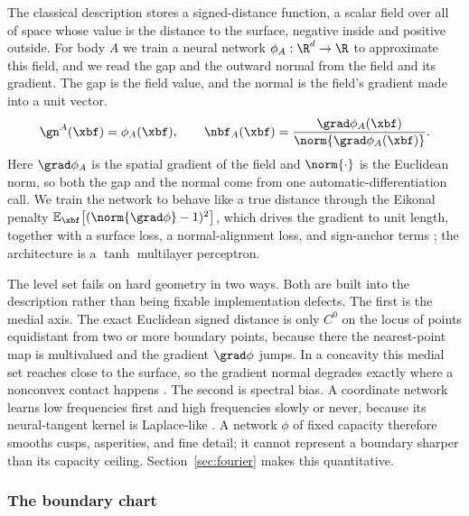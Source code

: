 The classical description stores a signed-distance function, a scalar field over all of space whose value
is the distance to the surface, negative inside and positive outside. For body $A$ we train a neural
network $\phi_A:\R^d\to\R$ to approximate this field, and we read the gap and the outward normal from the
field and its gradient. The gap is the field value, and the normal is the field's gradient made into a
unit vector.
%
\begin{equation}\label{eq:sdf-gap}
\gn^A(\xbf)=\phi_A(\xbf),\qquad
\nbf_A(\xbf)=\frac{\grad\phi_A(\xbf)}{\norm{\grad\phi_A(\xbf)}}.
\end{equation}
%
Here $\grad\phi_A$ is the spatial gradient of the field and $\norm{\cdot}$ is the Euclidean norm, so both
the gap and the normal come from one automatic-differentiation call. We train the network to behave like a
true distance through the Eikonal penalty $\mathbb E_{\xbf}\big[(\norm{\grad\phi}-1)^2\big]$, which drives
the gradient to unit length, together with a surface loss, a normal-alignment loss, and sign-anchor terms
\citep{liu2020implicit,park2019deepsdf}; the architecture is a $\tanh$ multilayer perceptron.

The level set fails on hard geometry in two ways. Both are built into the description rather than being
fixable implementation defects. The first is the medial axis. The exact Euclidean signed distance is only
$C^0$ on the locus of points equidistant from two or more boundary points, because there the nearest-point
map is multivalued and the gradient $\grad\phi$ jumps. In a concavity this medial set reaches close to the
surface, so the gradient normal degrades exactly where a nonconvex contact happens
\citep{kolev2003level}. The second is spectral bias. A coordinate network learns low frequencies first and
high frequencies slowly or never, because its neural-tangent kernel is Laplace-like
\citep{rahaman2019spectral}. A network $\phi$ of fixed capacity therefore smooths cusps, asperities, and
fine detail; it cannot represent a boundary sharper than its capacity ceiling.
Section~\ref{sec:fourier} makes this quantitative.

\subsubsection{The boundary chart}

